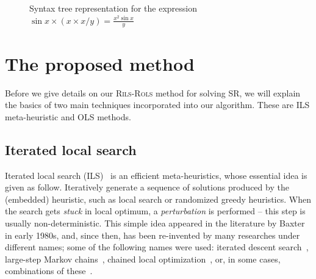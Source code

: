 \documentclass[a4paper,12pt]{elsarticle}
\begin{document}
	\begin{figure}[!ht]
		\centering
		
		\caption{Syntax tree representation for the expression $\sin x \times   ( x \times  x / y  )  = \frac{x^2 \sin x }{y}$}
		\label{fig:syntax-tree-example}
	\end{figure}
	
	
	
	\section{The proposed method}\label{sec:rils}
 
	Before we give details on our \textsc{Rils}-\textsc{Rols}  method for solving SR, we will explain the basics of two main techniques incorporated into our algorithm. These are ILS meta-heuristic and OLS methods. 
	
	\subsection{Iterated local search}
	Iterated local search (ILS)~\cite{lourencco2003iterated} is an efficient meta-heuristics, whose essential idea is given as follow. Iteratively generate a sequence of solutions produced by the (embedded) heuristic, such as local search or randomized greedy heuristics. When the search gets \emph{stuck} in local optimum, a \emph{perturbation} is performed -- this step is usually non-deterministic. This simple idea appeared in the literature by Baxter~\cite{baxter1981local} in early 1980s, and, since then, has been  re-invented by many researches under different names; some of the following names were used: iterated descent search~\cite{baum1998iterated}, large-step
	Markov chains~\cite{martin1991large}, chained local optimization~\cite{martin1996combining}, or, in some cases, combinations of these~\cite{applegate2003chained}. 
	
\end{document}

